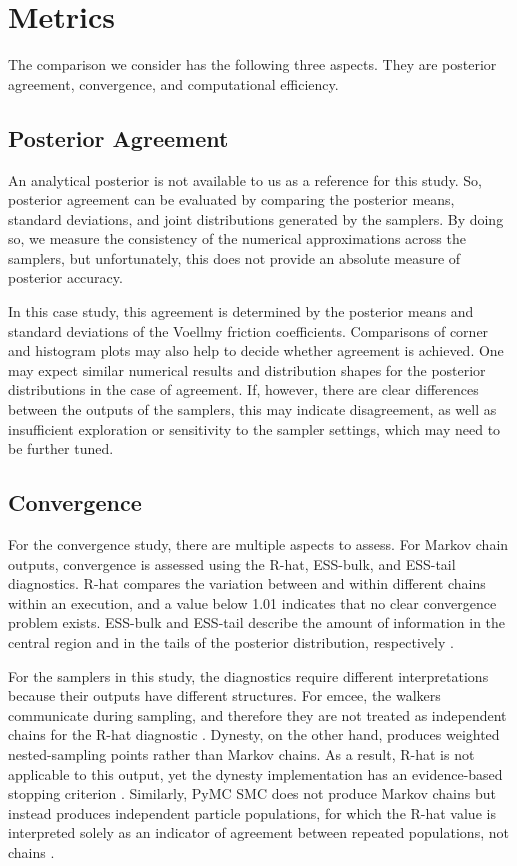 
\section{Metrics}
\label{sec:metrics}

The comparison we consider has the following three aspects. They are posterior agreement, convergence, and computational efficiency.

\subsection{Posterior Agreement}
An analytical posterior is not available to us as a reference for this study. So, posterior agreement can be evaluated by comparing the posterior means, standard deviations, and joint distributions generated by the samplers. By doing so, we measure the consistency of the numerical approximations across the samplers, but unfortunately, this does not provide an absolute measure of posterior accuracy.

In this case study, this agreement is determined by the posterior means and standard deviations of the Voellmy friction coefficients. Comparisons of corner and histogram plots may also help to decide whether agreement is achieved. One may expect similar numerical results and distribution shapes for the posterior distributions in the case of agreement. If, however, there are clear differences between the outputs of the samplers, this may indicate disagreement, as well as insufficient exploration or sensitivity to the sampler settings, which may need to be further tuned.

\subsection{Convergence}
For the convergence study, there are multiple aspects to assess. For Markov chain outputs, convergence is assessed using the R-hat, ESS-bulk, and ESS-tail diagnostics. R-hat compares the variation between and within different chains within an execution, and a value below 1.01 indicates that no clear convergence problem exists. ESS-bulk and ESS-tail describe the amount of information in the central region and in the tails of the posterior distribution, respectively \autocite{Vehtari2021,Albert2025}.

For the samplers in this study, the diagnostics require different interpretations because their outputs have different structures. For emcee, the walkers communicate during sampling, and therefore they are not treated as independent chains for the R-hat diagnostic \autocite{Goodman2010,ForemanMackey2013}. Dynesty, on the other hand, produces weighted nested-sampling points rather than Markov chains. As a result, R-hat is not applicable to this output, yet the dynesty implementation has an evidence-based stopping criterion \autocite{Speagle2020}. Similarly, PyMC SMC does not produce Markov chains but instead produces independent particle populations, for which the R-hat value is interpreted solely as an indicator of agreement between repeated populations, not chains \autocite{DelMoral2006}.

